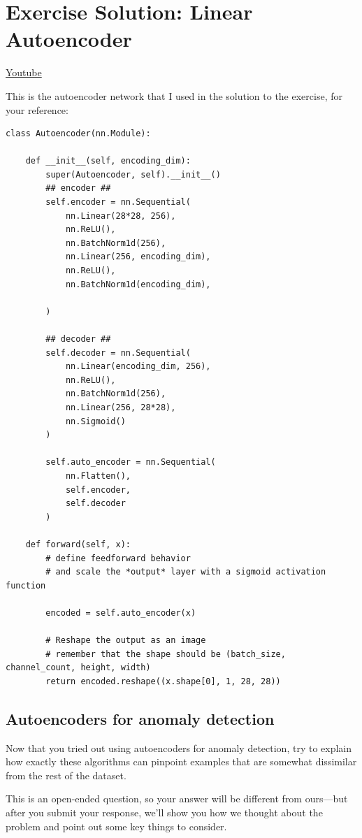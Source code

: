 \section{Exercise Solution: Linear Autoencoder}
\href{https://www.youtube.com/watch?v=VVdYTc2qxV0&ab_channel=Udacity}{Youtube} \newline

This is the autoencoder network that I used in the solution to the exercise, for your reference:
\begin{lstlisting}
class Autoencoder(nn.Module):

    def __init__(self, encoding_dim):
        super(Autoencoder, self).__init__()
        ## encoder ##
        self.encoder = nn.Sequential(
            nn.Linear(28*28, 256),
            nn.ReLU(),
            nn.BatchNorm1d(256),
            nn.Linear(256, encoding_dim),
            nn.ReLU(),
            nn.BatchNorm1d(encoding_dim),

        )

        ## decoder ##
        self.decoder = nn.Sequential(
            nn.Linear(encoding_dim, 256),
            nn.ReLU(),
            nn.BatchNorm1d(256),
            nn.Linear(256, 28*28),
            nn.Sigmoid()
        )

        self.auto_encoder = nn.Sequential(
            nn.Flatten(),
            self.encoder,
            self.decoder
        )

    def forward(self, x):
        # define feedforward behavior 
        # and scale the *output* layer with a sigmoid activation function

        encoded = self.auto_encoder(x)

        # Reshape the output as an image
        # remember that the shape should be (batch_size, channel_count, height, width)
        return encoded.reshape((x.shape[0], 1, 28, 28))
\end{lstlisting}

\subsection{Autoencoders for anomaly detection}

Now that you tried out using autoencoders for anomaly detection, try to explain how exactly these algorithms can pinpoint examples that are somewhat dissimilar from the rest of the dataset.\newline

This is an open-ended question, so your answer will be different from ours—but after you submit your response, we'll show you how we thought about the problem and point out some key things to consider.

